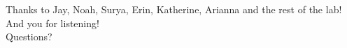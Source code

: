 \documentclass{beamer}
\begin{document}

\begin{frame}[standout]
Thanks to Jay, Noah, Surya, Erin, Katherine, Arianna and the rest of the lab! \\[1em]
And you for listening! \\[1em]
Questions?
\end{frame}
\end{document}
